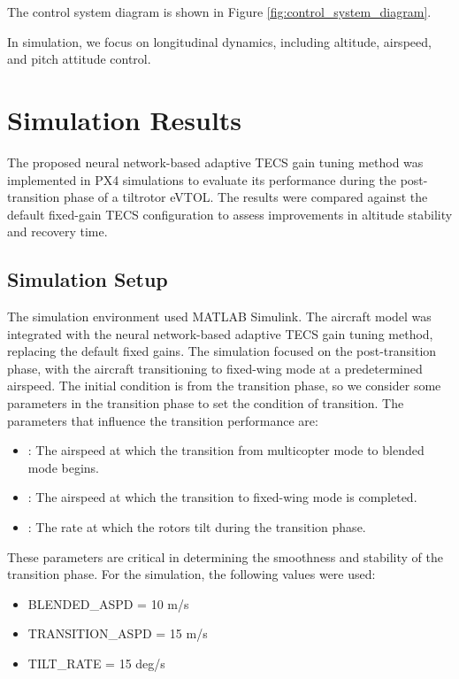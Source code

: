 \documentclass[journal,article,submit,pdftex,moreauthors]{Definitions/mdpi}
\begin{document}
The control system diagram is shown in Figure \ref{fig:control_system_diagram}.

In simulation, we focus on longitudinal dynamics, including altitude, airspeed, and pitch attitude control. 



\section{Simulation Results}
The proposed neural network-based adaptive TECS gain tuning method was implemented in PX4 simulations to evaluate its performance during the post-transition phase of a tiltrotor eVTOL. The results were compared against the default fixed-gain TECS configuration to assess improvements in altitude stability and recovery time.

\subsection{Simulation Setup}
The simulation environment used MATLAB Simulink. The aircraft model was integrated with the neural network-based adaptive TECS gain tuning method, replacing the default fixed gains. The simulation focused on the post-transition phase, with the aircraft transitioning to fixed-wing mode at a predetermined airspeed. The initial condition is from the transition phase, so we consider some parameters in the transition phase to set the condition of transition. The parameters that influence the transition performance are:

\begin{itemize}
    \item {}: The airspeed at which the transition from multicopter mode to blended mode begins.
    \item {}: The airspeed at which the transition to fixed-wing mode is completed.
    \item {}: The rate at which the rotors tilt during the transition phase.
\end{itemize}

These parameters are critical in determining the smoothness and stability of the transition phase. For the simulation, the following values were used:
\begin{itemize}
    \item BLENDED\_ASPD = 10 m/s
    \item TRANSITION\_ASPD = 15 m/s
    \item TILT\_RATE = 15 deg/s
\end{itemize}
\end{document}
